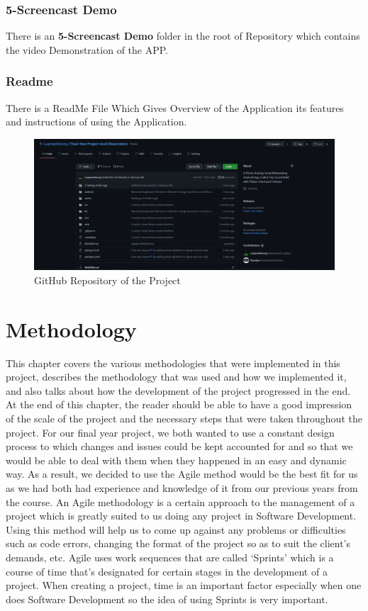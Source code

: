 \subsection{5-Screencast Demo}
There is an \textbf{5-Screencast Demo} folder in the root of Repository which contains the video Demonstration of the APP.
\subsection{Readme}
There is a ReadMe File Which Gives Overview of the Application its features and instructions of using the Application.

\begin{figure}[!htb]
    \centering
    \includegraphics[scale=0.35]{img/github.PNG}
    \caption{GitHub Repository of the Project}
    \label{fig:GitHub Repository of the Project}
\end{figure}
\chapter{Methodology}
This chapter covers the various methodologies that were implemented in this project, describes the methodology that was used and how we implemented it, and also talks about how the development of the project progressed in the end. At the end of this chapter, the reader should be able to have a good impression of the scale of the project and the necessary steps that were taken throughout the project. For our final year project, we both wanted to use a constant design process to which changes and issues could be kept accounted for and so that we would be able to deal with them when they happened in an easy and dynamic way. As a result, we decided to use the Agile method would be the best fit for us as we had both had experience and knowledge of it from our previous years from the course. An Agile methodology is a certain approach to the management of a project which is greatly suited to us doing any project in Software Development. Using this method will help us to come up against any problems or difficulties such as code errors, changing the format of the project so as to suit the client's demands, etc. Agile uses work sequences that are called ‘Sprints’ which is a course of time that’s designated for certain stages in the development of a project. When creating a project, time is an important factor especially when one does Software Development so the idea of using Sprints is very important.


